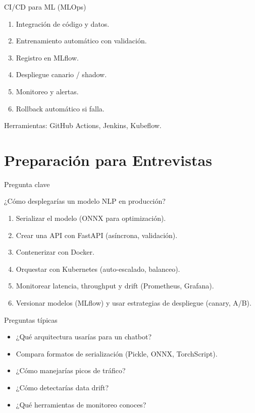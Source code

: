 \documentclass[aspectratio=169, 10pt, xcolor=table]{beamer}
\begin{document}
\begin{frame}{CI/CD para ML (MLOps)}
    \begin{enumerate}
        \item Integración de código y datos.
        \item Entrenamiento automático con validación.
        \item Registro en MLflow.
        \item Despliegue canario / shadow.
        \item Monitoreo y alertas.
        \item Rollback automático si falla.
    \end{enumerate}
    Herramientas: GitHub Actions, Jenkins, Kubeflow.
\end{frame}

\section{Preparación para Entrevistas}

\begin{frame}{Pregunta clave}
    \begin{block}{¿Cómo desplegarías un modelo NLP en producción?}
        \begin{enumerate}
            \item Serializar el modelo (ONNX para optimización).
            \item Crear una API con FastAPI (asíncrona, validación).
            \item Contenerizar con Docker.
            \item Orquestar con Kubernetes (auto-escalado, balanceo).
            \item Monitorear latencia, throughput y drift (Prometheus, Grafana).
            \item Versionar modelos (MLflow) y usar estrategias de despliegue (canary, A/B).
        \end{enumerate}
    \end{block}
\end{frame}

\begin{frame}{Preguntas típicas}
    \begin{itemize}
        \item ¿Qué arquitectura usarías para un chatbot?
        \item Compara formatos de serialización (Pickle, ONNX, TorchScript).
        \item ¿Cómo manejarías picos de tráfico?
        \item ¿Cómo detectarías data drift?
        \item ¿Qué herramientas de monitoreo conoces?
    \end{itemize}
\end{frame}
\end{document}
